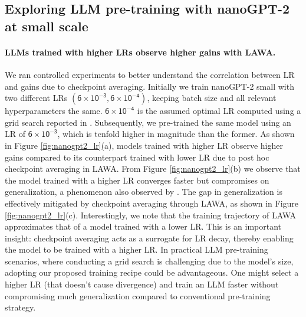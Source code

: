 \documentclass{article}
\newcommand{\method}{LAWA}
\begin{document}
\subsection{Exploring LLM pre-training with nanoGPT-2 at small scale} \label{sec:results-nanogpt2}

\paragraph{LLMs trained with higher LRs observe higher gains with \method{}.} We ran controlled experiments to better understand the correlation between LR and gains due to checkpoint averaging. Initially we train nanoGPT-2 small with two different LRs $(\mathsf{6 \times 10^{-3}}, \mathsf{6 \times 10^{-4}})$, keeping batch size and all relevant hyperparameters the same.  $\mathsf{6 \times 10^{-4}}$ is the assumed optimal LR computed using a grid search reported in \cite{liu2023sophia}. Subsequently, we pre-trained the same model using an LR of $\mathsf{6 \times 10^{-3}}$, which is tenfold higher in magnitude than the former. As shown in Figure \ref{fig:nanogpt2_lr}(a), models trained with higher LR observe higher gains compared to its counterpart trained with lower LR due to post hoc checkpoint averaging in \method{}. From Figure \ref{fig:nanogpt2_lr}(b) we observe that the model trained with a higher LR converges faster but compromises on generalization, a phenomenon also observed by \cite{kaur2022maximum}. The gap in generalization is effectively mitigated by checkpoint averaging through \method{}, as shown in Figure \ref{fig:nanogpt2_lr}(c). Interestingly, we note that the training trajectory of \method{} approximates that of a model trained with a lower LR. This is an important insight: checkpoint averaging acts as a surrogate for LR decay, thereby enabling the model to be trained with a higher LR. In practical LLM pre-training scenarios, where conducting a grid search is challenging due to the model's size, adopting our proposed training recipe could be advantageous. One might select a higher LR (that doesn’t cause divergence) and train an LLM faster without compromising much generalization compared to conventional pre-training strategy.
\end{document}
